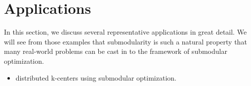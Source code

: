 \section{Applications}
In this section, we discuss several representative applications in great detail. We will see from those examples that submodularity is such a natural property  that many real-world problems can be cast in to the framework of submodular optimization. 

\begin{itemize}
\item \cite{MKC+15} distributed k-centers using submodular optimization.
\end{itemize}

